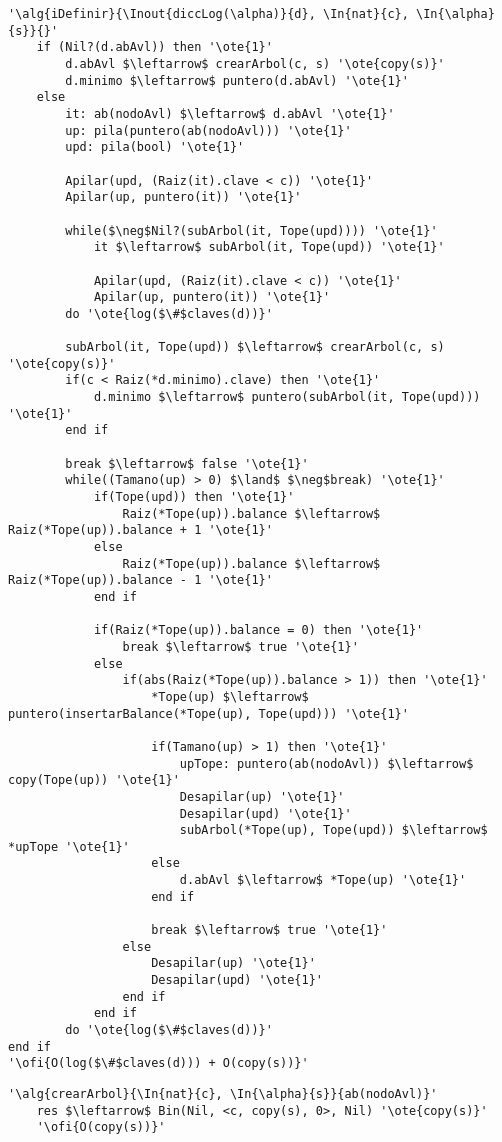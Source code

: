 \begin{lstlisting}[mathescape]
'\alg{iDefinir}{\Inout{diccLog(\alpha)}{d}, \In{nat}{c}, \In{\alpha}{s}}{}'
	if (Nil?(d.abAvl)) then '\ote{1}'
		d.abAvl $\leftarrow$ crearArbol(c, s) '\ote{copy(s)}'
		d.minimo $\leftarrow$ puntero(d.abAvl) '\ote{1}'
	else
		it: ab(nodoAvl) $\leftarrow$ d.abAvl '\ote{1}'
		up: pila(puntero(ab(nodoAvl))) '\ote{1}'
		upd: pila(bool) '\ote{1}'

		Apilar(upd, (Raiz(it).clave < c)) '\ote{1}'
		Apilar(up, puntero(it)) '\ote{1}'

		while($\neg$Nil?(subArbol(it, Tope(upd)))) '\ote{1}'
			it $\leftarrow$ subArbol(it, Tope(upd)) '\ote{1}'

			Apilar(upd, (Raiz(it).clave < c)) '\ote{1}'
			Apilar(up, puntero(it)) '\ote{1}'
		do '\ote{log($\#$claves(d))}'

		subArbol(it, Tope(upd)) $\leftarrow$ crearArbol(c, s) '\ote{copy(s)}'
		if(c < Raiz(*d.minimo).clave) then '\ote{1}'
			d.minimo $\leftarrow$ puntero(subArbol(it, Tope(upd))) '\ote{1}'
		end if

		break $\leftarrow$ false '\ote{1}'
		while((Tamano(up) > 0) $\land$ $\neg$break) '\ote{1}'
			if(Tope(upd)) then '\ote{1}'
				Raiz(*Tope(up)).balance $\leftarrow$ Raiz(*Tope(up)).balance + 1 '\ote{1}'
			else
				Raiz(*Tope(up)).balance $\leftarrow$ Raiz(*Tope(up)).balance - 1 '\ote{1}'
			end if

			if(Raiz(*Tope(up)).balance = 0) then '\ote{1}'
				break $\leftarrow$ true '\ote{1}'
			else
				if(abs(Raiz(*Tope(up)).balance > 1)) then '\ote{1}'
					*Tope(up) $\leftarrow$ puntero(insertarBalance(*Tope(up), Tope(upd))) '\ote{1}'

					if(Tamano(up) > 1) then '\ote{1}'
						upTope: puntero(ab(nodoAvl)) $\leftarrow$ copy(Tope(up)) '\ote{1}'
						Desapilar(up) '\ote{1}'
						Desapilar(upd) '\ote{1}'
						subArbol(*Tope(up), Tope(upd)) $\leftarrow$ *upTope '\ote{1}'
					else
						d.abAvl $\leftarrow$ *Tope(up) '\ote{1}'
					end if

					break $\leftarrow$ true '\ote{1}'
				else
					Desapilar(up) '\ote{1}'
					Desapilar(upd) '\ote{1}'
				end if
			end if
		do '\ote{log($\#$claves(d))}'
end if
'\ofi{O(log($\#$claves(d))) + O(copy(s))}'
\end{lstlisting}

\begin{lstlisting}[mathescape]
'\alg{crearArbol}{\In{nat}{c}, \In{\alpha}{s}}{ab(nodoAvl)}'
	res $\leftarrow$ Bin(Nil, <c, copy(s), 0>, Nil) '\ote{copy(s)}'
	'\ofi{O(copy(s))}'
\end{lstlisting}

